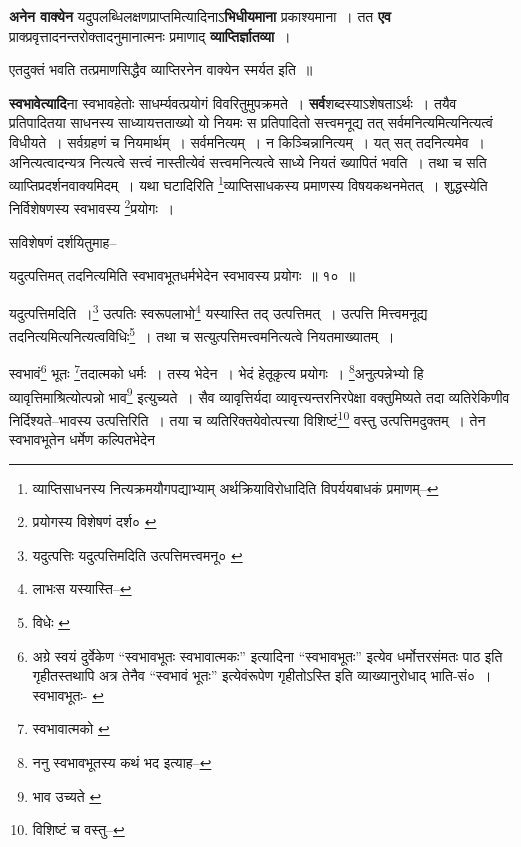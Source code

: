 \documentclass[article,12pt,a4paper]{memoir}
\begin{document}
	  \pstart \textbf{अनेन वाक्येन} यदुपलब्धिलक्षणप्राप्तमित्यादिनाऽ\textbf{भिधीयमाना} प्रकाश्यमाना । तत \textbf{एव} प्राक्प्रवृत्तादनन्तरोक्तादनुमानात्मनः प्रमाणाद् \textbf{व्याप्तिर्ज्ञातव्या} ।
	\pend
      

	  \pstart एतदुक्तं भवति तत्प्रमाणसिद्धैव व्याप्तिरनेन वाक्येन स्मर्यत इति ॥
	\pend
      

	  \pstart \textbf{स्वभावेत्यादि}ना स्वभावहेतोः साधर्म्यवत्प्रयोगं विवरितुमुपक्रमते । \textbf{सर्व}शब्दस्याऽशेषताऽर्थः । तयैव प्रतिपादितया साधनस्य साध्यायत्तताख्यो यो नियमः स प्रतिपादितो  \leavevmode{} सत्त्वमनूद्य तत् सर्वमनित्यमित्यनित्यत्वं विधीयते । सर्वग्रहणं च नियमार्थम् । सर्वमनित्यम् । न किञ्चिन्नानित्यम् । यत् सत् तदनित्यमेव । अनित्यत्वादन्यत्र नित्यत्वे सत्त्वं नास्तीत्येवं सत्त्वमनित्यत्वे साध्ये नियतं ख्यापितं भवति । तथा च सति व्याप्तिप्रदर्शनवाक्यमिदम् । यथा घटादिरिति \footnote{व्याप्तिसाधनस्य \cite{dp-msA} \cite{dp-msB} \cite{dp-msC} \cite{dp-msD} \cite{dp-edP} \cite{dp-edH} \cite{dp-edE} \cite{dp-edN} नित्यक्रमयौगपद्याभ्याम् अर्थक्रियाविरोधादिति विपर्ययबाधकं प्रमाणम्--\cite{dp-msD-n}}\-व्याप्तिसाधकस्य प्रमाणस्य विषयकथनमेतत् । शुद्धस्येति निर्विशेषणस्य स्वभावस्य \footnote{प्रयोगस्य विशेषणं दर्श० \cite{dp-msB}}\-प्रयोगः ।
	\pend
      

	  \pstart सविशेषणं दर्शयितुमाह--
	\pend
      
	  \bigskip
	  \begingroup
	

	  \pstart यदुत्पत्तिमत् तदनित्यमिति स्वभावभूतधर्मभेदेन स्वभावस्य प्रयोगः ॥ १० ॥
	\pend
      
	  \endgroup
	
	  \bigskip
	  \begingroup
	

	  \pstart यदुत्पत्तिमदिति ।\footnote{यदुत्पत्तिः \cite{dp-msC} यदुत्पत्तिमदिति उत्पत्तिमत्त्वमनू० \cite{dp-msA}} उत्पतिः स्वरूपलाभो\footnote{लाभःस यस्यास्ति--\cite{dp-msB}} यस्यास्ति तद् उत्पत्तिमत् । उत्पत्ति मित्त्वमनूद्य तदनित्यमित्यनित्यत्वविधिः\footnote{विधेः \cite{dp-msA} \cite{dp-edP} \cite{dp-edH}} । तथा च सत्युत्पत्तिमत्त्वमनित्यत्वे नियतमाख्यातम् ।
	\pend
       

	  \pstart स्वभावं\footnote{अग्रे स्वयं दुर्वेकेण “स्वभावभूतः स्वभावात्मकः” इत्यादिना “स्वभावभूतः” इत्येव धर्मोत्तरसंमतः पाठ इति गृहीतस्तथापि अत्र तेनैव “स्वभावं भूतः” इत्येवंरूपेण गृहीतोऽस्ति इति व्याख्यानुरोधाद् भाति-सं० । स्वभावभूतः-\cite{dp-msA} \cite{dp-msB} \cite{dp-msC} \cite{dp-msD} \cite{dp-edP} \cite{dp-edH} \cite{dp-edE} \cite{dp-edN}} भूतः \footnote{स्वभावात्मको \cite{dp-msA} \cite{dp-msB} \cite{dp-msC} \cite{dp-msD} \cite{dp-edP} \cite{dp-edH} \cite{dp-edE} \cite{dp-edN}}\-तदात्मको धर्मः । तस्य भेदेन । भेदं हेतूकृत्य प्रयोगः । \footnote{ननु स्वभावभूतस्य कथं भद इत्याह--\cite{dp-msD-n}}\-अनुत्पन्नेभ्यो हि व्यावृत्तिमाश्रित्योत्पन्नो भाव\footnote{भाव उच्यते \cite{dp-msA} \cite{dp-msB} \cite{dp-msD} \cite{dp-edP} \cite{dp-edH} \cite{dp-edE} \cite{dp-edN}} इत्युच्यते । सैव व्यावृत्तिर्यदा व्यावृत्त्यन्तरनिरपेक्षा वक्तुमिष्यते तदा व्यतिरेकिणीव निर्दिश्यते--भावस्य उत्पत्तिरिति । तया च व्यतिरिक्तयेवोत्पत्त्या विशिष्टं\footnote{विशिष्टं च वस्तु--\cite{dp-msC}} वस्तु उत्पत्तिमदुक्तम् । तेन स्वभावभूतेन धर्मेण कल्पितभेदेन
	\pend
      
\end{document}
